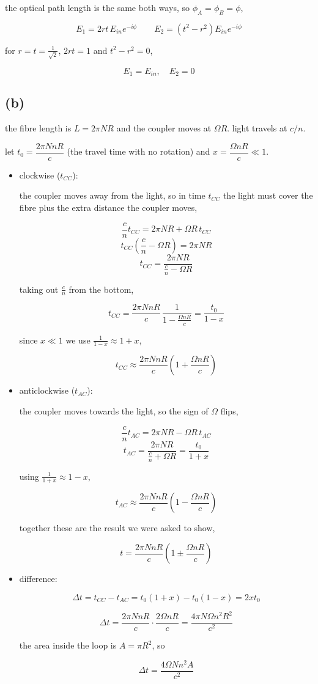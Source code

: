 \documentclass{article}
\begin{document}
the optical path length is the same both ways, so $\phi_A=\phi_B=\phi$,

\[
E_1=2rt\,E_{in}e^{-i\phi}
\qquad
E_2=(t^2-r^2)E_{in}e^{-i\phi}
\]

for $r=t=\frac{1}{\sqrt2}$, $2rt=1$ and $t^2-r^2=0$,

\[
\boxed{E_1=E_{in}, \quad E_2=0}
\]

\subsection*{(b)}

the fibre length is $L=2\pi NR$ and the coupler moves at $\Omega R$. light travels at $c/n$.

let $t_0=\dfrac{2\pi NnR}{c}$ (the travel time with no rotation) and $x=\dfrac{\Omega nR}{c}\ll1$.

\begin{itemize}
    \item clockwise ($t_{CC}$):
    
the coupler moves away from the light, so in time $t_{CC}$ the light must cover the fibre plus the extra distance the coupler moves,

\[
\frac{c}{n}t_{CC}=2\pi NR+\Omega R\,t_{CC}
\]
\[
t_{CC}\left(\frac{c}{n}-\Omega R\right)=2\pi NR
\]
\[
t_{CC}=\frac{2\pi NR}{\frac{c}{n}-\Omega R}
\]

taking out $\frac{c}{n}$ from the bottom,

\[
t_{CC}=\frac{2\pi NnR}{c}\,\frac{1}{1-\frac{\Omega nR}{c}}
=\frac{t_0}{1-x}
\]

since $x\ll1$ we use $\frac{1}{1-x}\approx1+x$,

\[
\boxed{t_{CC}\approx\frac{2\pi NnR}{c}\left(1+\frac{\Omega nR}{c}\right)}
\]

    \item anticlockwise ($t_{AC}$): 
    
the coupler moves towards the light, so the sign of $\Omega$ flips,

\[
\frac{c}{n}t_{AC}=2\pi NR-\Omega R\,t_{AC}
\]
\[
t_{AC}=\frac{2\pi NR}{\frac{c}{n}+\Omega R}
=\frac{t_0}{1+x}
\]

using $\frac{1}{1+x}\approx1-x$,

\[
\boxed{t_{AC}\approx\frac{2\pi NnR}{c}\left(1-\frac{\Omega nR}{c}\right)}
\]

together these are the result we were asked to show,

\[
t=\frac{2\pi NnR}{c}\left(1\pm\frac{\Omega nR}{c}\right)
\]

    \item difference:

\[
\Delta t=t_{CC}-t_{AC}
=t_0(1+x)-t_0(1-x)=2xt_0
\]

\[
\Delta t=\frac{2\pi NnR}{c}\cdot\frac{2\Omega nR}{c}
=\frac{4\pi N\Omega n^2R^2}{c^2}
\]

the area inside the loop is $A=\pi R^2$, so

\[
\boxed{\Delta t=\frac{4\Omega Nn^2A}{c^2}}
\]

\end{itemize}
\end{document}
